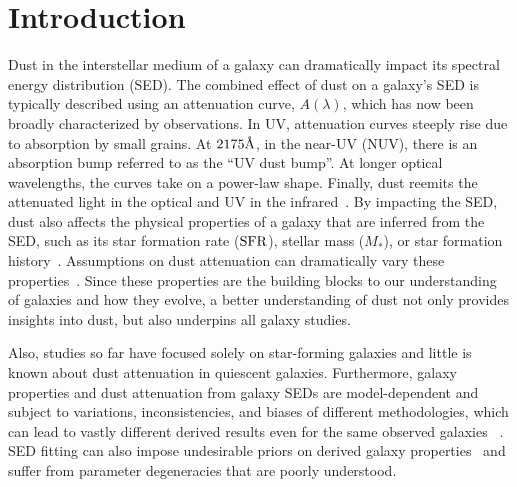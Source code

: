 \section{Introduction} \label{sec:intro} 
Dust in the interstellar medium of a galaxy can dramatically impact its
spectral energy distribution (SED). %
The combined effect of dust on a galaxy's SED is typically described using
an attenuation curve, $A(\lambda)$, which has now been broadly characterized 
by observations. 
In UV, attenuation curves steeply rise due to absorption by small grains.
At $2175\AA$, in the near-UV (NUV), there is an absorption bump referred to as
the ``UV dust bump''. 
At longer optical wavelengths, the curves take on a power-law shape. 
Finally, dust reemits the attenuated light in the optical and UV in the
infrared~\citep[for an overview see][]{calzetti2001, draine2003,
galliano2018}.
By impacting the SED, dust also affects the physical properties of a galaxy
that are inferred from the SED, such as its star formation rate (${\rm SFR}$),
stellar mass ($M_*$), or star formation history~\citep[see reviews by][]{walcher2011,
conroy2013}. 
Assumptions on dust attenuation can dramatically vary these
properties~\citep{kriek2013, reddy2015, salim2016, salim2020}.
Since these properties are the building blocks to our understanding of
galaxies and how they evolve, a better understanding of dust not only provides
insights into dust, but also underpins all galaxy studies.  

Also, studies so far have focused solely on star-forming galaxies and little is known
about dust attenuation in quiescent galaxies. 
Furthermore, galaxy properties and dust attenuation from
galaxy SEDs are model-dependent and subject to variations, inconsistencies, and biases of
different methodologies, which can 
lead to vastly different derived results even for the same observed galaxies ~\citep[\eg][]{speagle2014, katsianis2020}.
SED fitting can also impose undesirable priors on derived galaxy
properties~\citep{carnall2018, leja2019} and suffer from parameter
degeneracies that are poorly understood. 

